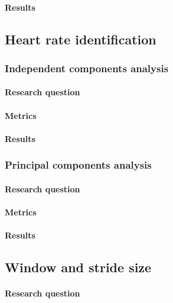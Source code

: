 \paragraph{Results}
\subsection{Heart rate identification}
\subsubsection{Independent components analysis}
\label{section:ica_assumption}
\paragraph{Research question}
\paragraph{Metrics}
\paragraph{Results}

\subsubsection{Principal components analysis}
\paragraph{Research question}
\paragraph{Metrics}
\paragraph{Results}
%

\subsection{Window and stride size}
\paragraph{Research question}

